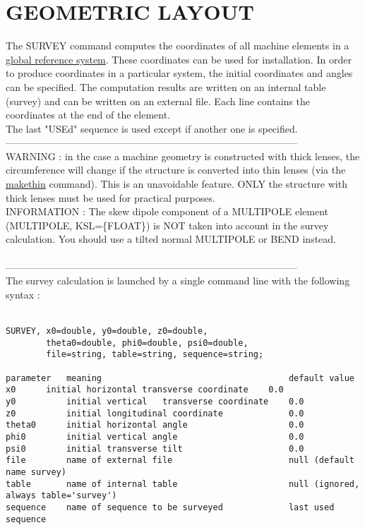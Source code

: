  
\chapter{GEOMETRIC LAYOUT}

The SURVEY command computes the coordinates of all machine elements in a \href{../Introduction/conventions.html}{global reference system}. These coordinates can be used for installation. In order to produce coordinates in a particular system, the initial coordinates and angles can be specified. The computation results are written on an internal table (survey) and can be written on an external file. Each line contains the coordinates at the end of the element.
\\ The last "USEd" sequence is used except if another one is specified.
\\
-----------------------------------------------------------------------------------------
\\ WARNING : in the case a machine geometry is constructed with thick lenses, the circumference will change if the structure is converted into thin lenses (via the \href{../makethin/makethin.html}{makethin} command). This is an unavoidable feature. ONLY the structure with thick lenses must be used for practical purposes.
\\ INFORMATION : The skew dipole component of a MULTIPOLE element (MULTIPOLE, KSL=\{FLOAT\}) is NOT taken into account in the survey calculation. You should use a tilted normal MULTIPOLE or BEND instead.
\\
\\
-----------------------------------------------------------------------------------------
\\ The survey calculation is launched by a single command line with the following syntax : 
\\
\\

\begin{verbatim}
SURVEY, x0=double, y0=double, z0=double, 
        theta0=double, phi0=double, psi0=double,
        file=string, table=string, sequence=string;

parameter   meaning                                     default value
x0 	    initial horizontal transverse coordinate    0.0
y0          initial vertical   transverse coordinate    0.0
z0          initial longitudinal coordinate             0.0
theta0      initial horizontal angle                    0.0
phi0        initial vertical angle                      0.0
psi0        initial transverse tilt                     0.0
file        name of external file                       null (default name survey)
table       name of internal table                      null (ignored, always table='survey')
sequence    name of sequence to be surveyed             last used sequence
\end{verbatim}

